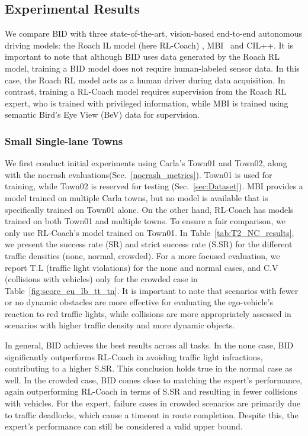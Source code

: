 \subsection{Experimental Results}
\label{sec:Results}
\hspace{1pc}We compare BID with three state-of-the-art, vision-based end-to-end autonomous driving models: the Roach IL model (here RL-Coach) \cite{Zhang:2021}, MBI~\cite{Hu:2022} and CIL++\cite{xiao2023scaling}. 
It is important to note that although BID uses data generated by the Roach RL model, training a BID model does not require human-labeled sensor data. 
In this case, the Roach RL model acts as a human driver during data acquisition. 
In contrast, training a RL-Coach model requires supervision from the Roach RL expert, who is trained with privileged information, while MBI is trained using semantic Bird's Eye View (BeV) data for supervision.


\subsubsection{Small Single-lane Towns} \label{sec:small_town_results}

\hspace{1pc}We first conduct initial experiments using Carla's Town01 and Town02, along with the nocrash evaluations(Sec.~\ref{nocrash_metrics}). 
Town01 is used for training, while Town02 is reserved for testing (Sec.~\ref{sec:Dataset}). 
MBI provides a model trained on multiple Carla towns, but no model is available that is specifically trained on Town01 alone. 
On the other hand, RL-Coach has models trained on both Town01 and multiple towns. To ensure a fair comparison, we only use RL-Coach's model trained on Town01. 
In Table~\ref{tab:T2_NC_results}, we present the success rate (SR) and strict success rate (S.SR) for the different traffic densities (none, normal, crowded). 
For a more focused evaluation, we report T.L (traffic light violations) for the none and normal cases, and C.V (collisions with vehicles) only for the crowded case in Table~\ref{fig:score_eu_lb_tt_tn}. 
It is important to note that scenarios with fewer or no dynamic obstacles are more effective for evaluating the ego-vehicle's reaction to red traffic lights, while collisions are more appropriately assessed in scenarios with higher traffic density and more dynamic objects.


In general, BID achieves the best results across all tasks. 
In the none case, BID significantly outperforms RL-Coach in avoiding traffic light infractions, contributing to a higher S.SR.
This conclusion holds true in the normal case as well. 
In the crowded case, BID comes close to matching the expert's performance, again outperforming RL-Coach in terms of S.SR and resulting in fewer collisions with vehicles. 
For the expert, failure cases in crowded scenarios are primarily due to traffic deadlocks, which cause a timeout in route completion. 
Despite this, the expert's performance can still be considered a valid upper bound.


